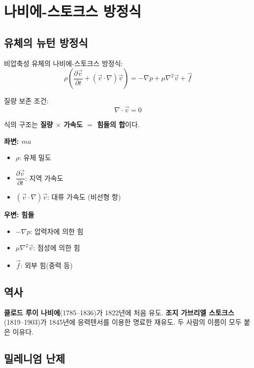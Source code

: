 \documentclass[11pt,a4paper]{article}
\begin{document}
\section{나비에-스토크스 방정식}

\subsection{유체의 뉴턴 방정식}

비압축성 유체의 나비에-스토크스 방정식:
\begin{equation}
\rho\left(\frac{\partial \vec{v}}{\partial t} + (\vec{v} \cdot \nabla)\vec{v}\right) = -\nabla p + \mu \nabla^2 \vec{v} + \vec{f}
\label{eq:ns}
\end{equation}

질량 보존 조건:
\begin{equation}
\nabla \cdot \vec{v} = 0
\end{equation}

식의 구조는 \textbf{질량 $\times$ 가속도 $=$ 힘들의 합}이다.

\textbf{좌변: $ma$}
\begin{itemize}[leftmargin=*, itemsep=1pt]
  \item $\rho$: 유체 밀도
  \item $\dfrac{\partial \vec{v}}{\partial t}$: 지역 가속도
  \item $(\vec{v} \cdot \nabla)\vec{v}$: 대류 가속도 (비선형 항)
\end{itemize}

\textbf{우변: 힘들}
\begin{itemize}[leftmargin=*, itemsep=1pt]
  \item $-\nabla p$: 압력차에 의한 힘
  \item $\mu \nabla^2 \vec{v}$: 점성에 의한 힘
  \item $\vec{f}$: 외부 힘(중력 등)
\end{itemize}

\subsection{역사}

\textbf{클로드 루이 나비에}(1785--1836)가 1822년에 처음 유도. \textbf{조지 가브리엘 스토크스}(1819--1903)가 1845년에 응력텐서를 이용한 명료한 재유도. 두 사람의 이름이 모두 붙은 이유다.

\subsection{밀레니엄 난제}
\end{document}
